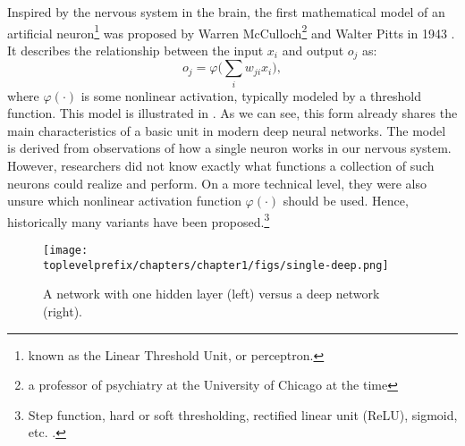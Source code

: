 \documentclass[../../book-main.tex]{subfiles}
\begin{document}
Inspired by the nervous system in the brain, the first mathematical model of an artificial neuron\footnote{known as the Linear Threshold Unit, or perceptron.} was proposed by Warren McCulloch\footnote{a professor of psychiatry at the University of Chicago at the time} and Walter Pitts in 1943 \cite{McCulloch-Pitts}. It describes the relationship between the input $x_i$ and output $o_j$ as:
\begin{equation}
    o_j = \varphi\Big( \sum_i w_{ji}x_i\Big),  
\end{equation}
where $\varphi(\cdot)$ is some nonlinear activation, typically modeled by a threshold function. This model is illustrated in . As we can see, this form already shares the main characteristics of a basic unit in modern deep neural networks. The model is derived from observations of how a single neuron works in our nervous system. However, researchers did not know exactly what functions a collection of such neurons could realize and perform. On a more technical level, they were also unsure which nonlinear activation function $\varphi(\cdot)$ should be used. Hence, historically many variants have been proposed.\footnote{Step function, hard or soft thresholding, rectified linear unit (ReLU), sigmoid, etc. \cite{dubey2022activation}.}

\begin{figure}[t]
\centering
\texttt{[image: \\toplevelprefix/chapters/chapter1/figs/single-deep.png]}
    \caption{A network with one hidden layer (left) versus a deep network (right).}
    \label{fig:single-deep}
\end{figure}
\end{document}
